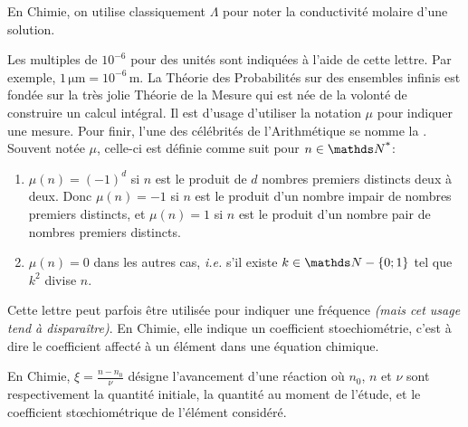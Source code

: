 \cadre{$\Lambda$} En Chimie, on utilise classiquement $\Lambda$ pour noter la conductivité molaire d'une solution.


\vspace{0.8em}

\cadre{$\mu$} Les multiples de $10^{-6}$ pour des unités sont indiquées à l'aide de cette lettre. Par exemple, $1 \, \si{\micro\metre} = 10^{-6} \, \si{\metre}$.
La Théorie des Probabilités sur des ensembles infinis est fondée sur la très jolie Théorie de la Mesure qui est née de la volonté de construire un calcul intégral. Il est d'usage d'utiliser la notation $\mu$ pour indiquer une mesure.
Pour finir, l'une des célébrités de l'Arithmétique se nomme la . Souvent notée $\mu$, celle-ci est définie comme suit pour $n \in \NNs$:
\begin{enumerate}
	\renewcommand{\labelitemi}{$\bullet$}

	\item $\mu(n) = (-1)^d$ si $n$ est le produit de $d$ nombres premiers distincts deux à deux. Donc $\mu(n) = -1$ si $n$ est le produit d'un nombre impair de nombres premiers distincts, et $\mu(n) = 1$ si $n$ est le produit d'un nombre pair de nombres premiers distincts.
	
	\item $\mu(n) = 0$ dans les autres cas, \textit{i.e.} s'il existe $k \in \NN - \{0 ; 1\}$ tel que $k^2$ divise $n$.
\end{enumerate}


\cadre{$\nu$} Cette lettre peut parfois être utilisée pour indiquer une fréquence \emph{(mais cet usage tend à disparaître)}. En Chimie, elle indique un coefficient stoechiométrie, c'est à dire le coefficient affecté à un élément dans une équation chimique.


\cadre{$\xi$} En Chimie, $\xi = \frac{n - n_0}{\nu}$  désigne l'avancement d'une réaction où $n_0$, $n$ et $\nu$ sont respectivement la quantité initiale, la quantité au moment de l'étude, et le coefficient stœchiométrique de l'élément considéré.


